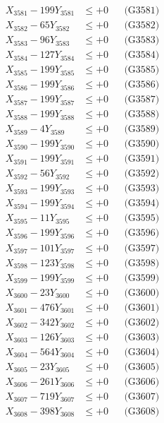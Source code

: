 \documentclass[a4paper,10pt]{article}
\begin{document}
{\begin{align}
\allowbreak
X_{3581} - 199Y_{3581} &\leq +0 && \text{(G3581)} \\
X_{3582} - 65Y_{3582} &\leq +0 && \text{(G3582)} \\
X_{3583} - 96Y_{3583} &\leq +0 && \text{(G3583)} \\
X_{3584} - 127Y_{3584} &\leq +0 && \text{(G3584)} \\
X_{3585} - 199Y_{3585} &\leq +0 && \text{(G3585)} \\
X_{3586} - 199Y_{3586} &\leq +0 && \text{(G3586)} \\
X_{3587} - 199Y_{3587} &\leq +0 && \text{(G3587)} \\
X_{3588} - 199Y_{3588} &\leq +0 && \text{(G3588)} \\
X_{3589} - 4Y_{3589} &\leq +0 && \text{(G3589)} \\
X_{3590} - 199Y_{3590} &\leq +0 && \text{(G3590)} \\
\allowbreak
X_{3591} - 199Y_{3591} &\leq +0 && \text{(G3591)} \\
X_{3592} - 56Y_{3592} &\leq +0 && \text{(G3592)} \\
X_{3593} - 199Y_{3593} &\leq +0 && \text{(G3593)} \\
X_{3594} - 199Y_{3594} &\leq +0 && \text{(G3594)} \\
X_{3595} - 11Y_{3595} &\leq +0 && \text{(G3595)} \\
X_{3596} - 199Y_{3596} &\leq +0 && \text{(G3596)} \\
X_{3597} - 101Y_{3597} &\leq +0 && \text{(G3597)} \\
X_{3598} - 123Y_{3598} &\leq +0 && \text{(G3598)} \\
X_{3599} - 199Y_{3599} &\leq +0 && \text{(G3599)} \\
X_{3600} - 23Y_{3600} &\leq +0 && \text{(G3600)} \\
\allowbreak
X_{3601} - 476Y_{3601} &\leq +0 && \text{(G3601)} \\
X_{3602} - 342Y_{3602} &\leq +0 && \text{(G3602)} \\
X_{3603} - 126Y_{3603} &\leq +0 && \text{(G3603)} \\
X_{3604} - 564Y_{3604} &\leq +0 && \text{(G3604)} \\
X_{3605} - 23Y_{3605} &\leq +0 && \text{(G3605)} \\
X_{3606} - 261Y_{3606} &\leq +0 && \text{(G3606)} \\
X_{3607} - 719Y_{3607} &\leq +0 && \text{(G3607)} \\
X_{3608} - 398Y_{3608} &\leq +0 && \text{(G3608)} \\

\end{align}}
\end{document}
